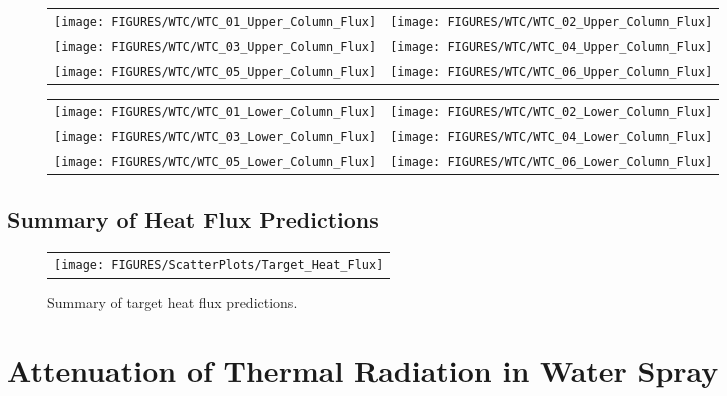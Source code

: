 \begin{figure}[p]
\begin{tabular*}{\textwidth}{l@{\extracolsep{\fill}}r}
\texttt{[image: FIGURES/WTC/WTC\_01\_Upper\_Column\_Flux]} &
\texttt{[image: FIGURES/WTC/WTC\_02\_Upper\_Column\_Flux]} \\
\texttt{[image: FIGURES/WTC/WTC\_03\_Upper\_Column\_Flux]} &
\texttt{[image: FIGURES/WTC/WTC\_04\_Upper\_Column\_Flux]} \\
\texttt{[image: FIGURES/WTC/WTC\_05\_Upper\_Column\_Flux]} &
\texttt{[image: FIGURES/WTC/WTC\_06\_Upper\_Column\_Flux]}
\end{tabular*}
\label{NIST_WTC_Upper_Column_Flux}
\end{figure}

\begin{figure}[p]
\begin{tabular*}{\textwidth}{l@{\extracolsep{\fill}}r}
\texttt{[image: FIGURES/WTC/WTC\_01\_Lower\_Column\_Flux]} &
\texttt{[image: FIGURES/WTC/WTC\_02\_Lower\_Column\_Flux]} \\
\texttt{[image: FIGURES/WTC/WTC\_03\_Lower\_Column\_Flux]} &
\texttt{[image: FIGURES/WTC/WTC\_04\_Lower\_Column\_Flux]} \\
\texttt{[image: FIGURES/WTC/WTC\_05\_Lower\_Column\_Flux]} &
\texttt{[image: FIGURES/WTC/WTC\_06\_Lower\_Column\_Flux]}
\end{tabular*}
\label{NIST_WTC_Lower_Column_Flux}
\end{figure}


\clearpage

\subsection{Summary of Heat Flux Predictions}

\begin{figure}[h!]
\begin{center}
\begin{tabular}{c}
\texttt{[image: FIGURES/ScatterPlots/Target\_Heat\_Flux]}
\end{tabular}
\end{center}
\caption[Summary of target heat flux predictions]
{Summary of target heat flux predictions.}
\end{figure}



\clearpage

\section{Attenuation of Thermal Radiation in Water Spray}

